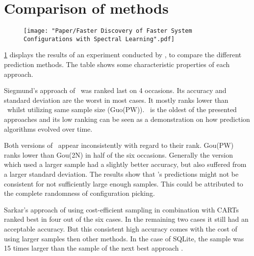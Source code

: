 \section{Comparison of methods}
\begin{figure}[t]
	\centering
	\label{tab:ConclusionPerformanceOverview}
	\vspace{-.5\baselineskip}
	\texttt{[image: "Paper/Faster Discovery of Faster System Configurations with Spectral Learning".pdf]}
	\vspace{-1\baselineskip}	
\end{figure}
\cref{tab:ConclusionPerformanceOverview} displays the results of an experiment conducted by \citet{FasterDiscoveryofFasterSystemConfigurationsSiegmund2017}, to compare the different prediction methods. The table shows some characteristic properties of each approach.

Siegmund's approach of \AFID~was ranked last on 4 occasions. Its accuracy and standard deviation are the worst in most cases. It mostly ranks lower than \VAPP~whilst utilizing same sample size (Guo(PW)). \WHAT~is the oldest of the presented approaches and its low ranking can be seen as a demonstration on how prediction algorithms evolved over time.

Both versions of \VAPP~appear inconsistently with regard to their rank. Gou(PW) ranks lower than Gou(2N) in half of the six occasions. Generally the version which used a larger sample had a slightly better accuracy, but also suffered from a larger standard deviation. The results show that \VAPP's predictions might not be consistent for not sufficiently large enough samples. This could be attributed to the complete randomness of configuration picking.

Sarkar's approach of using cost-efficient sampling in combination with CARTs ranked best in four out of the six cases. In the remaining two cases it still had an acceptable accuracy. But this consistent high accuracy comes with the cost of using larger samples then other methods. In the case of SQLite, the sample was 15 times larger than the sample of the next best approach \WHAT. 

